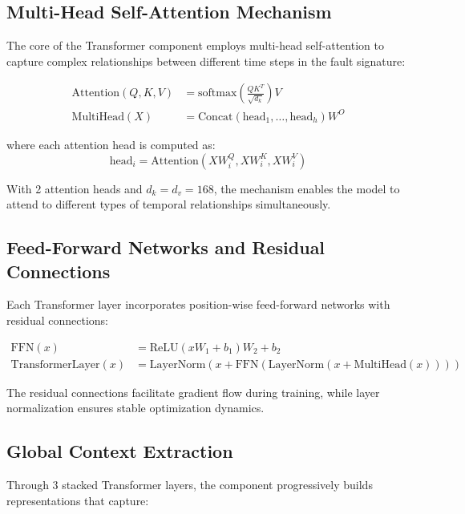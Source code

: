 \subsection{Multi-Head Self-Attention Mechanism}
\label{subsec:self_attention}

The core of the Transformer component employs multi-head self-attention to capture complex relationships between different time steps in the fault signature:

\begin{align}
\text{Attention}(Q, K, V) &= \text{softmax}\left(\frac{QK^T}{\sqrt{d_k}}\right)V \\
\text{MultiHead}(X) &= \text{Concat}(\text{head}_1, \ldots, \text{head}_h)W^O
\end{align}

where each attention head is computed as:
\begin{equation}
\text{head}_i = \text{Attention}(XW_i^Q, XW_i^K, XW_i^V)
\end{equation}

With 2 attention heads and $d_k = d_v = 168$, the mechanism enables the model to attend to different types of temporal relationships simultaneously.

\subsection{Feed-Forward Networks and Residual Connections}
\label{subsec:ffn_residual}

Each Transformer layer incorporates position-wise feed-forward networks with residual connections:

\begin{align}
\text{FFN}(x) &= \text{ReLU}(xW_1 + b_1)W_2 + b_2 \\
\text{TransformerLayer}(x) &= \text{LayerNorm}(x + \text{FFN}(\text{LayerNorm}(x + \text{MultiHead}(x))))
\end{align}

The residual connections facilitate gradient flow during training, while layer normalization ensures stable optimization dynamics.

\subsection{Global Context Extraction}
\label{subsec:global_context}

Through 3 stacked Transformer layers, the component progressively builds representations that capture:

